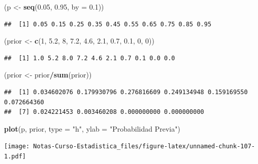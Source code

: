 \documentclass[
  12pt,
]{book}
\newenvironment{Shaded}{\begin{snugshade}}{\end{snugshade}}
\newcommand{\DataTypeTok}[1]{\textcolor[rgb]{0.13,0.29,0.53}{#1}}
\newcommand{\DecValTok}[1]{\textcolor[rgb]{0.00,0.00,0.81}{#1}}
\newcommand{\FloatTok}[1]{\textcolor[rgb]{0.00,0.00,0.81}{#1}}
\newcommand{\KeywordTok}[1]{\textcolor[rgb]{0.13,0.29,0.53}{\textbf{#1}}}
\newcommand{\NormalTok}[1]{#1}
\newcommand{\OperatorTok}[1]{\textcolor[rgb]{0.81,0.36,0.00}{\textbf{#1}}}
\newcommand{\StringTok}[1]{\textcolor[rgb]{0.31,0.60,0.02}{#1}}
\theoremstyle{definition}
\theoremstyle{definition}
\theoremstyle{definition}
\theoremstyle{remark}
\begin{document}
\begin{Shaded}
\begin{Highlighting}[]
\NormalTok{(p <-}\StringTok{ }\KeywordTok{seq}\NormalTok{(}\FloatTok{0.05}\NormalTok{, }\FloatTok{0.95}\NormalTok{, }\DataTypeTok{by =} \FloatTok{0.1}\NormalTok{))}
\end{Highlighting}
\end{Shaded}

\begin{verbatim}
##  [1] 0.05 0.15 0.25 0.35 0.45 0.55 0.65 0.75 0.85 0.95
\end{verbatim}

\begin{Shaded}
\begin{Highlighting}[]
\NormalTok{(prior <-}\StringTok{ }\KeywordTok{c}\NormalTok{(}\DecValTok{1}\NormalTok{, }\FloatTok{5.2}\NormalTok{, }\DecValTok{8}\NormalTok{, }\FloatTok{7.2}\NormalTok{, }\FloatTok{4.6}\NormalTok{, }\FloatTok{2.1}\NormalTok{, }\FloatTok{0.7}\NormalTok{, }\FloatTok{0.1}\NormalTok{, }\DecValTok{0}\NormalTok{, }
    \DecValTok{0}\NormalTok{))}
\end{Highlighting}
\end{Shaded}

\begin{verbatim}
##  [1] 1.0 5.2 8.0 7.2 4.6 2.1 0.7 0.1 0.0 0.0
\end{verbatim}

\begin{Shaded}
\begin{Highlighting}[]
\NormalTok{(prior <-}\StringTok{ }\NormalTok{prior}\OperatorTok{/}\KeywordTok{sum}\NormalTok{(prior))}
\end{Highlighting}
\end{Shaded}

\begin{verbatim}
##  [1] 0.034602076 0.179930796 0.276816609 0.249134948 0.159169550 0.072664360
##  [7] 0.024221453 0.003460208 0.000000000 0.000000000
\end{verbatim}

\begin{Shaded}
\begin{Highlighting}[]
\KeywordTok{plot}\NormalTok{(p, prior, }\DataTypeTok{type =} \StringTok{"h"}\NormalTok{, }\DataTypeTok{ylab =} \StringTok{"Probabilidad Previa"}\NormalTok{)}
\end{Highlighting}
\end{Shaded}

\texttt{[image: Notas-Curso-Estadistica\_files/figure-latex/unnamed-chunk-107-1.pdf]}
\end{document}

